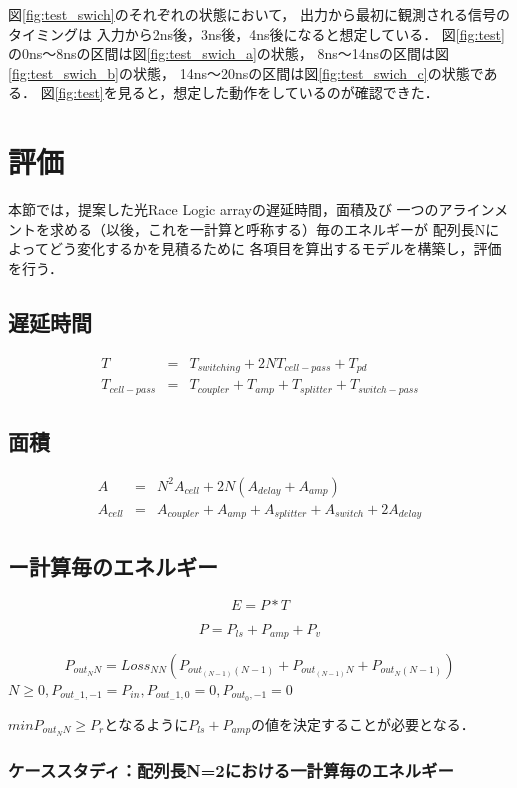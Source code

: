図\ref{fig:test_swich}のそれぞれの状態において，
出力から最初に観測される信号のタイミングは
入力から2ns後，3ns後，4ns後になると想定している．
図\ref{fig:test}の0ns〜8nsの区間は図\ref{fig:test_swich_a}の状態，
8ns〜14nsの区間は図\ref{fig:test_swich_b}の状態，
14ns〜20nsの区間は図\ref{fig:test_swich_c}の状態である．
図\ref{fig:test}を見ると，想定した動作をしているのが確認できた．

\section{評価}
本節では，提案した光Race Logic arrayの遅延時間，面積及び
一つのアラインメントを求める（以後，これを一計算と呼称する）毎のエネルギーが
配列長Nによってどう変化するかを見積るために
各項目を算出するモデルを構築し，評価を行う．
\subsection{遅延時間}
\begin{eqnarray}
T &=& T_{switching}+2NT_{cell-pass}+T_{pd} \nonumber \\
T_{cell-pass} &=& T_{coupler}+T_{amp}+T_{splitter}+T_{switch-pass}
\label{eq:latency}
\end{eqnarray}

\subsection{面積}
\begin{eqnarray}
A &=& N^2 A_{cell}+2N(A_{delay}+A_{amp}) \nonumber \\
A_{cell} &=& A_{coupler}+A_{amp}+A_{splitter}+A_{switch}+2A_{delay}
\label{eq:Area}
\end{eqnarray}

\subsection{ー計算毎のエネルギー}
\begin{equation}
E=P*T
\label{eq:Energy}
\end{equation}

\begin{equation}
P=P_{ls}+P_{amp}+P_{v}
\label{eq:power}
\end{equation}

\begin{equation}
P_{out_NN}=Loss_{NN}(P_{out_(N-1)(N-1)}+P_{out_(N-1)N}+P_{out_N(N-1)})
\label{eq:power_out}
\end{equation}
$N \geq 0,P_{out_-1,-1}=P_{in},P_{out_-1,0}=0,P_{out_0,-1}=0$

$minP_{out_NN} \geq P_{r}となるようにP_{ls}+P_{amp}$の値を決定することが必要となる．

\subsubsection{ケーススタディ：配列長N=2における一計算毎のエネルギー}

